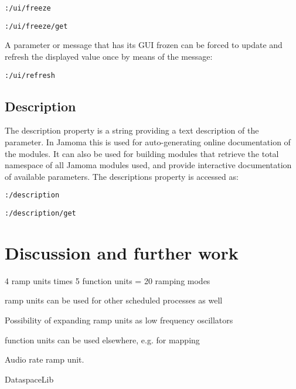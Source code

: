 \documentclass{NIME-alternate}
\begin{document}
\texttt{:/ui/freeze}

\texttt{:/ui/freeze/get}

A parameter or message that has its GUI frozen can be forced to update and refresh the displayed value once by means of the message:

\texttt{:/ui/refresh}






\subsection{Description} %
\label{sub:description}

The description property is a string providing a text description of the parameter. In Jamoma this is used for auto-generating online documentation of the modules. It can also be used for building modules that retrieve the total namespace of all Jamoma modules used, and provide interactive documentation of available parameters. The descriptions property is accessed as:

\texttt{:/description}

\texttt{:/description/get}







\section{Discussion and further work} %
\label{sec:discussion_and_further_work}

4 ramp units times 5 function units = 20 ramping modes

ramp units can be used for other scheduled processes as well

Possibility of expanding ramp units as low frequency oscillators

function units can be used elsewhere, e.g. for mapping

Audio rate ramp unit.

DataspaceLib
\end{document}
